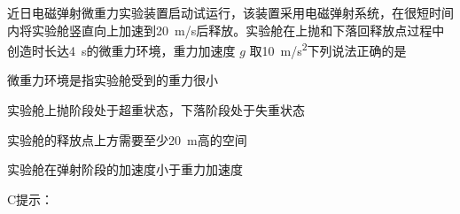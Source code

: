 近日电磁弹射微重力实验装置启动试运行，该装置采用电磁弹射系统，在很短时间内将实验舱竖直向上加速到\qty{20}{m/s}后释放。实验舱在上抛和下落回释放点过程中创造时长达\qty{4}{s}的微重力环境，重力加速度 \(g\) 取\qty{10}{m/s^2}下列说法正确的是\paren[]
\begin{choices}
	\item 微重力环境是指实验舱受到的重力很小
	\item 实验舱上抛阶段处于超重状态，下落阶段处于失重状态
	\item 实验舱的释放点上方需要至少\qty{20}{m}高的空间
	\item 实验舱在弹射阶段的加速度小于重力加速度
\end{choices}
\begin{answer}
    C\qquad 提示：
\end{answer}